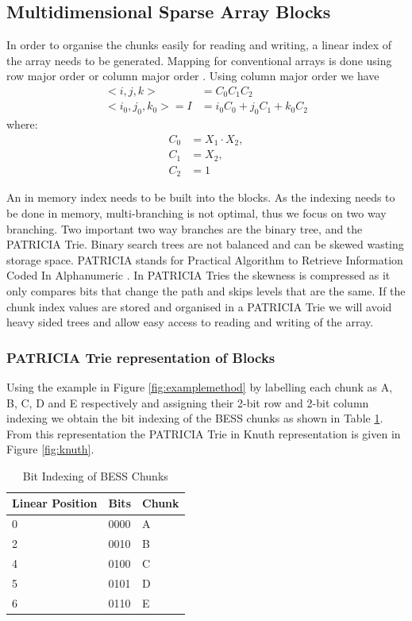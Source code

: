 \subsection{Multidimensional Sparse Array Blocks}
 In order to organise the chunks easily for reading and writing, a linear index of the array needs to be generated. Mapping for conventional arrays is done using row major order or column major order \cite{otoo:2013:ced}. Using column major order we have 
 \begin{equation}
 	\begin{split}
 		<i,j,k> & = C_0 C_1 C_2 \\
 		<i_0,j_0,k_0> = I & = i_0C_0 + j_0C_1 + k_0C_2
 	\end{split}
 \end{equation}
 where:
 \begin{align*}
 	C_0 & = X_1 \cdot X_2,\\
 	 C_1 & = X_2, \\
 	 C_2 & = 1
 \end{align*}
 
 An in memory index needs to be built into the blocks. As the indexing needs to be done in memory, multi-branching is not optimal, thus we focus on two way branching. Two important two way branches are the binary tree, and the PATRICIA Trie. Binary search trees are not balanced and can be skewed wasting storage space. PATRICIA stands for Practical Algorithm to Retrieve Information Coded In Alphanumeric \cite{morrison1968}. In PATRICIA Tries the skewness is compressed as it only compares bits that change the path and skips levels that are the same. If the chunk index values are stored and organised in a PATRICIA Trie we will avoid heavy sided trees and allow easy access to reading and writing of the array.
 
 \subsubsection{PATRICIA Trie representation of Blocks}
 Using the example in Figure \ref{fig:examplemethod} by labelling each chunk as A, B, C, D and E respectively and assigning their 2-bit row and 2-bit column indexing we obtain the bit indexing of the BESS chunks as shown in Table \ref{tab:index}. From this representation the PATRICIA Trie in Knuth representation is given in Figure \ref{fig:knuth}.
 
\begin{table}[H]
	\caption{Bit Indexing of BESS Chunks}\label{tab:index}
	\begin{center}
		\begin{tabular}{lll}
			\hline
			 \textbf{Linear Position} & \textbf{Bits} & \textbf{Chunk} \\
			\hline
			0 & 0000 & A \\
			2 & 0010 & B \\
			4 & 0100 & C \\
			5 & 0101 & D \\
			6 & 0110 & E \\
			\hline
		\end{tabular}
	\end{center}
\end{table}
 
